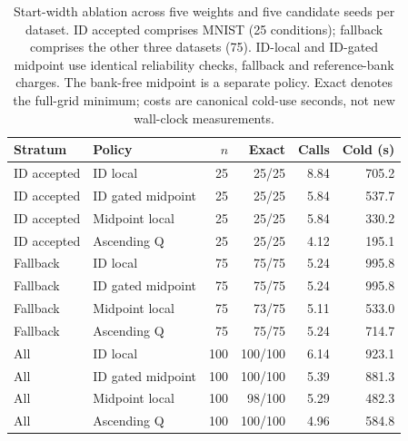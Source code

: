 \begin{table}[H]
\caption{Start-width ablation across five weights and five candidate seeds per dataset. ID accepted comprises MNIST (25 conditions); fallback comprises the other three datasets (75). ID-local and ID-gated midpoint use identical reliability checks, fallback and reference-bank charges. The bank-free midpoint is a separate policy. Exact denotes the full-grid minimum; costs are canonical cold-use seconds, not new wall-clock measurements.}\label{tab:gated}
\small
\setlength{\tabcolsep}{3pt}
\begin{tabular*}{\textwidth}{@{\extracolsep{\fill}}llrrrr@{}}
\toprule
Stratum & Policy & $n$ & Exact & Calls & Cold (s) \\
\midrule
ID accepted & ID local & 25 & 25/25 & 8.84 & 705.2 \\
ID accepted & ID gated midpoint & 25 & 25/25 & 5.84 & 537.7 \\
ID accepted & Midpoint local & 25 & 25/25 & 5.84 & 330.2 \\
ID accepted & Ascending Q & 25 & 25/25 & 4.12 & 195.1 \\
Fallback & ID local & 75 & 75/75 & 5.24 & 995.8 \\
Fallback & ID gated midpoint & 75 & 75/75 & 5.24 & 995.8 \\
Fallback & Midpoint local & 75 & 73/75 & 5.11 & 533.0 \\
Fallback & Ascending Q & 75 & 75/75 & 5.24 & 714.7 \\
All & ID local & 100 & 100/100 & 6.14 & 923.1 \\
All & ID gated midpoint & 100 & 100/100 & 5.39 & 881.3 \\
All & Midpoint local & 100 & 98/100 & 5.29 & 482.3 \\
All & Ascending Q & 100 & 100/100 & 4.96 & 584.8 \\
\bottomrule\end{tabular*}
\end{table}
